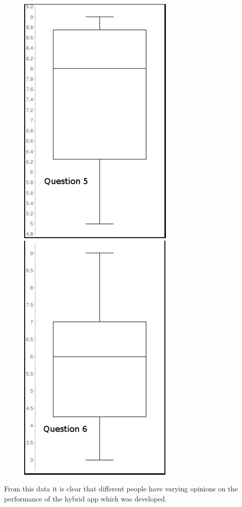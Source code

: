 \begin{center}
\begin{figure}[H]
\includegraphics[scale=0.45]{images/q5}
\includegraphics[scale=0.45]{images/q6}
\end{figure}
\end{center}
From this data it is clear that different people have varying opinions on the performance of the hybrid app which was developed. 

